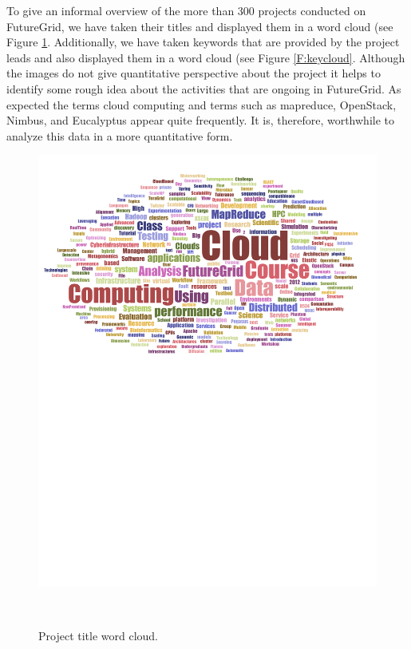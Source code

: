 \documentclass[graybox]{svmult}
\begin{document}
To give an informal overview of the more than 300 projects conducted on FutureGrid, we have taken their titles and displayed them in a word cloud (see Figure \ref{F:wordcloud}. Additionally, we have taken keywords that are provided by the project leads and also displayed them in a word cloud (see Figure \ref{F:keycloud}. Although the images do not give quantitative perspective about the project it helps to identify some rough idea about the activities that are ongoing in FutureGrid.  As expected the terms cloud computing and terms such as mapreduce, OpenStack, Nimbus, and Eucalyptus appear quite frequently. It is, therefore, worthwhile to analyze this data in a more quantitative form.

\begin{figure}[htb]
\begin{minipage}[t]{1.0\textwidth}
 \centering
   \includegraphics[width=1.0\textwidth]{images/fg-title-wordcloud.pdf}
 \caption{Project title word cloud.}\label{F:wordcloud}
\end{minipage}
\vspace{24pt}\\

\end{figure}
\end{document}
